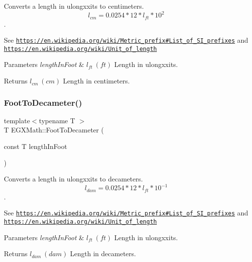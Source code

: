 Converts a length in ulongxxits to centimeters. \[ l_{cm}=0.0254 * 12 * l_{ft} * 10^{2} \]. 

See \href{https://en.wikipedia.org/wiki/Metric_prefix#List_of_SI_prefixes}{\tt https\+://en.\+wikipedia.\+org/wiki/\+Metric\+\_\+prefix\#\+List\+\_\+of\+\_\+\+S\+I\+\_\+prefixes} and \href{https://en.wikipedia.org/wiki/Unit_of_length}{\tt https\+://en.\+wikipedia.\+org/wiki/\+Unit\+\_\+of\+\_\+length} 
\begin{DoxyParams}{Parameters}
{\em length\+In\+Foot} & $ l_{ft}\ (ft)$ Length in ulongxxits. \\
\hline
\end{DoxyParams}
\begin{DoxyReturn}{Returns}
$ l_{cm}\ (cm)$ Length in centimeters. 
\end{DoxyReturn}
\mbox{\label{group___e_g_x_math-_conversions-_length_conversions-_imperial-_foot-_s_i_gad602d1172e39cba2884e22630a2859a0}} 
\subsubsection{\texorpdfstring{Foot\+To\+Decameter()}{FootToDecameter()}}
{\footnotesize\ttfamily template$<$typename T $>$ \\
T E\+G\+X\+Math\+::\+Foot\+To\+Decameter (\begin{DoxyParamCaption}\item[{const T}]{length\+In\+Foot }\end{DoxyParamCaption})}



Converts a length in ulongxxits to decameters. \[ l_{dam}=0.0254 * 12 * l_{ft} * 10^{-1} \]. 

See \href{https://en.wikipedia.org/wiki/Metric_prefix#List_of_SI_prefixes}{\tt https\+://en.\+wikipedia.\+org/wiki/\+Metric\+\_\+prefix\#\+List\+\_\+of\+\_\+\+S\+I\+\_\+prefixes} and \href{https://en.wikipedia.org/wiki/Unit_of_length}{\tt https\+://en.\+wikipedia.\+org/wiki/\+Unit\+\_\+of\+\_\+length} 
\begin{DoxyParams}{Parameters}
{\em length\+In\+Foot} & $ l_{ft}\ (ft)$ Length in ulongxxits. \\
\hline
\end{DoxyParams}
\begin{DoxyReturn}{Returns}
$ l_{dam}\ (dam)$ Length in decameters. 
\end{DoxyReturn}
\mbox{\label{group___e_g_x_math-_conversions-_length_conversions-_imperial-_foot-_s_i_ga99eff28d9b367ca718238a9142b71478}} 
